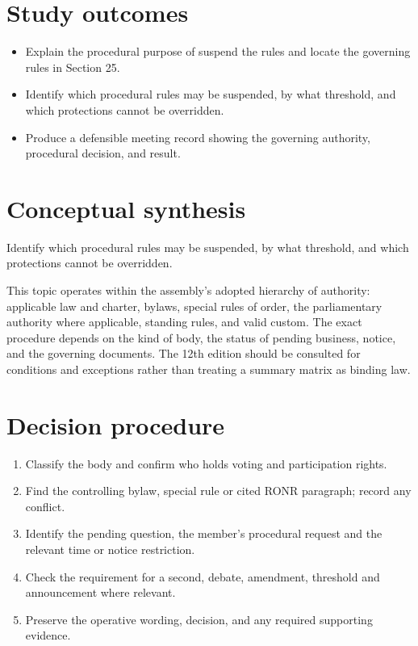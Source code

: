 \documentclass[11pt]{article}
\begin{document}
\SuiteOpen
{}
\section{Study outcomes}
\begin{itemize}[leftmargin=*,itemsep=4pt]
\item Explain the procedural purpose of suspend the rules and locate the governing rules in Section 25.
\item Identify which procedural rules may be suspended, by what threshold, and which protections cannot be overridden.
\item Produce a defensible meeting record showing the governing authority, procedural decision, and result.
\end{itemize}

\section{Conceptual synthesis}
Identify which procedural rules may be suspended, by what threshold, and which protections cannot be overridden.

This topic operates within the assembly’s adopted hierarchy of authority: applicable law and charter, bylaws, special rules of order, the parliamentary authority where applicable, standing rules, and valid custom. The exact procedure depends on the kind of body, the status of pending business, notice, and the governing documents. The 12th edition should be consulted for conditions and exceptions rather than treating a summary matrix as binding law.
\section{Decision procedure}
\begin{enumerate}[leftmargin=*,itemsep=4pt]
\item Classify the body and confirm who holds voting and participation rights.
\item Find the controlling bylaw, special rule or cited RONR paragraph; record any conflict.
\item Identify the pending question, the member’s procedural request and the relevant time or notice restriction.
\item Check the requirement for a second, debate, amendment, threshold and announcement where relevant.
\item Preserve the operative wording, decision, and any required supporting evidence.
\end{enumerate}
\end{document}
